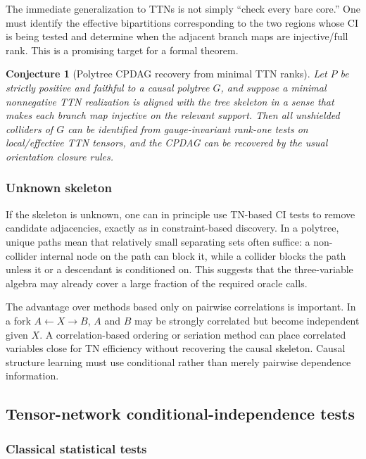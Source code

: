 \documentclass[11pt]{article}
\newtheorem{conjecture}[definition]{Conjecture}
\theoremstyle{remark}
\begin{document}
The immediate generalization to TTNs is not simply ``check every bare core.'' One must identify the effective bipartitions corresponding to the two regions whose CI is being tested and determine when the adjacent branch maps are injective/full rank. This is a promising target for a formal theorem.

\begin{conjecture}[Polytree CPDAG recovery from minimal TTN ranks]
Let $P$ be strictly positive and faithful to a causal polytree $G$, and suppose a minimal nonnegative TTN realization is aligned with the tree skeleton in a sense that makes each branch map injective on the relevant support. Then all unshielded colliders of $G$ can be identified from gauge-invariant rank-one tests on local/effective TTN tensors, and the CPDAG can be recovered by the usual orientation closure rules.
\end{conjecture}

\subsubsection{Unknown skeleton}

If the skeleton is unknown, one can in principle use TN-based CI tests to remove candidate adjacencies, exactly as in constraint-based discovery. In a polytree, unique paths mean that relatively small separating sets often suffice: a non-collider internal node on the path can block it, while a collider blocks the path unless it or a descendant is conditioned on. This suggests that the three-variable algebra may already cover a large fraction of the required oracle calls.

The advantage over methods based only on pairwise correlations is important. In a fork $A\leftarrow X\to B$, $A$ and $B$ may be strongly correlated but become independent given $X$. A correlation-based ordering or seriation method can place correlated variables close for TN efficiency without recovering the causal skeleton. Causal structure learning must use conditional rather than merely pairwise dependence information.

\subsection{Tensor-network conditional-independence tests}
\label{sec:tn-ci-tests}

\subsubsection{Classical statistical tests}
\end{document}
